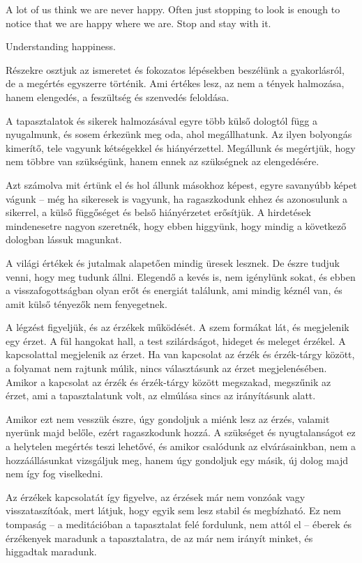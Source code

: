 A lot of us think we are never happy. Often just stopping to look is
enough to notice that we are happy where we are. Stop and stay with it.

Understanding happiness.

Részekre osztjuk az ismeretet és fokozatos lépésekben beszélünk a
gyakorlásról, de a megértés egyszerre történik. Ami értékes lesz, az nem
a tények halmozása, hanem elengedés, a feszültség és szenvedés
feloldása.

A tapasztalatok és sikerek halmozásával egyre több külső dologtól függ a
nyugalmunk, és sosem érkezünk meg oda, ahol megállhatunk. Az ilyen
bolyongás kimerítő, tele vagyunk kétségekkel és hiányérzettel. Megállunk
és megértjük, hogy nem többre van szükségünk, hanem ennek az szükségnek
az elengedésére.

Azt számolva mit értünk el és hol állunk másokhoz képest, egyre
savanyúbb képet vágunk -- még ha sikeresek is vagyunk, ha ragaszkodunk
ehhez és azonosulunk a sikerrel, a külső függőséget és belső
hiányérzetet erősítjük. A hirdetések mindenesetre nagyon szeretnék, hogy
ebben higgyünk, hogy mindig a következő dologban lássuk magunkat.

A világi értékek és jutalmak alapetően mindig üresek lesznek. De észre
tudjuk venni, hogy meg tudunk állni. Elegendő a kevés is, nem igénylünk
sokat, és ebben a visszafogottságban olyan erőt és energiát találunk,
ami mindig kéznél van, és amit külső tényezők nem fenyegetnek.

A légzést figyeljük, és az érzékek működését. A szem formákat lát, és
megjelenik egy érzet. A fül hangokat hall, a test szilárdságot, hideget
és meleget érzékel. A kapcsolattal megjelenik az érzet. Ha van kapcsolat
az érzék és érzék-tárgy között, a folyamat nem rajtunk múlik, nincs
választásunk az érzet megjelenésében. Amikor a kapcsolat az érzék és
érzék-tárgy között megszakad, megszűnik az érzet, ami a tapasztalatunk
volt, az elmúlása sincs az irányításunk alatt.

Amikor ezt nem vesszük észre, úgy gondoljuk a miénk lesz az érzés,
valamit nyerünk majd belőle, ezért ragaszkodunk hozzá. A szükséget és
nyugtalanságot ez a helytelen megértés teszi lehetővé, és amikor
csalódunk az elvárásainkban, nem a hozzáállásunkat vizsgáljuk meg, hanem
úgy gondoljuk egy másik, új dolog majd nem így fog viselkedni.

Az érzékek kapcsolatát így figyelve, az érzések már nem vonzóak vagy
visszataszítóak, mert látjuk, hogy egyik sem lesz stabil és megbízható.
Ez nem tompaság -- a meditációban a tapasztalat felé fordulunk, nem
attól el -- éberek és érzékenyek maradunk a tapasztalatra, de az már nem
irányít minket, és higgadtak maradunk.


